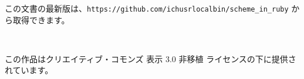 



この文書の最新版は、\verb|https://github.com/ichusrlocalbin/scheme_in_ruby| から取得できます。

{\Huge \ccby} \\
\begin{flushright}
\vspace*{-2em}
この作品はクリエイティブ・コモンズ 表示 3.0 非移植 ライセンスの下に提供されています。
\end{flushright}
\pagebreak




